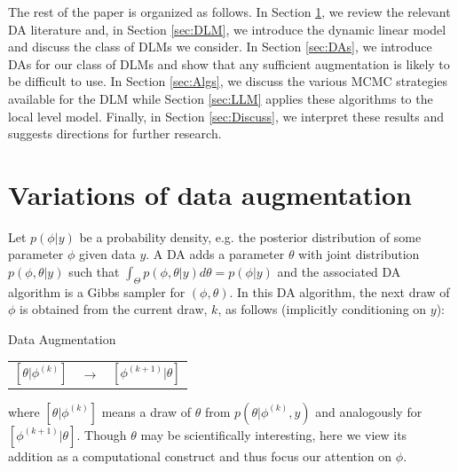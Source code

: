 \documentclass[12pt]{article}
\begin{document}
The rest of the paper is organized as follows. In Section \ref{sec:DA}, we review the relevant DA literature and, in Section \ref{sec:DLM}, we introduce the dynamic linear model and discuss the class of DLMs we consider. In Section \ref{sec:DAs}, we introduce DAs for our class of DLMs and show that any sufficient augmentation is likely to be difficult to use. In Section \ref{sec:Algs}, we discuss the various MCMC strategies available for the DLM while Section \ref{sec:LLM} applies these algorithms to the local level model. Finally, in Section \ref{sec:Discuss}, we interpret these results and suggests directions for further research.

\section{Variations of data augmentation}\label{sec:DA}

Let $p(\phi|y)$ be a probability density, e.g. the posterior distribution of some parameter $\phi$ given data $y$. A DA adds a parameter $\theta$ with joint distribution $p(\phi,\theta|y)$ such that $\int_{\Theta}p(\phi,\theta|y)d\theta = p(\phi|y)$ and the associated DA algorithm is a Gibbs sampler for $(\phi,\theta)$. In this DA algorithm, the next draw of $\phi$ is obtained from the current draw, $k$, as follows (implicitly conditioning on $y$):
\begin{alg*}[DA]Data Augmentation\label{alg:DA}
{\small \vspace{-.5cm}
\begin{center}
  \begin{tabular}{lll}
  $[\theta|\phi^{(k)}]$ &$\to$& $[\phi^{(k+1)}|\theta]$
\end{tabular}
\end{center}
}
\end{alg*}
\noindent where $[\theta|\phi^{(k)}]$ means a draw of $\theta$ from $p(\theta|\phi^{(k)},y)$ and analogously for $[\phi^{(k+1)}|\theta]$. Though $\theta$ may be scientifically interesting, here we view its addition as a computational construct and thus focus our attention on $\phi$. 
\end{document}
